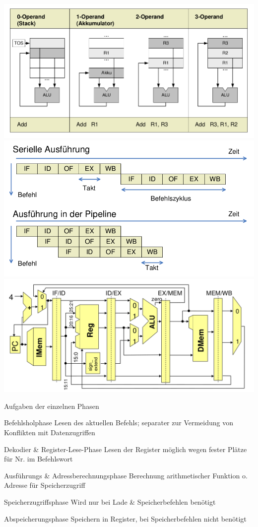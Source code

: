 \documentclass[10pt,landscape]{article}
\begin{document}
\begin{multicols}{3}
  \begin{center}
    \includegraphics[width=\textwidth/7]{Assets/RA2_Operanden.png}
    \includegraphics[width=\textwidth/7]{Assets/RA2_pipelineCPU.png}
    \includegraphics[width=\textwidth/4]{Assets/RA2_mehrzyklenCPU.png}
  \end{center}
  
  Aufgaben der einzelnen Phasen
  \begin{description*}
    \item[Befehlsholphase] Lesen des aktuellen Befehls; separater zur Vermeidung von Konflikten mit Datenzugriffen
    \item[Dekodier \& Register-Lese-Phase] Lesen der Register möglich wegen fester Plätze für Nr. im Befehlswort
    \item[Ausführungs \& Adressberechnungsphase] Berechnung arithmetischer Funktion o. Adresse für Speicherzugriff
    \item[Speicherzugriffsphase] Wird nur bei Lade \& Speicherbefehlen benötigt
    \item[Abspeicherungsphase] Speichern in Register, bei Speicherbefehlen nicht benötigt
  \end{description*}
  

\end{multicols}
\end{document}
